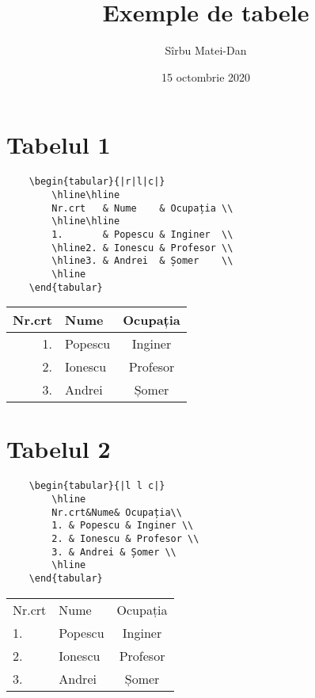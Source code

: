\documentclass[9pt,a4paper]{article}
\title{\bf Exemple de tabele}
\author{Sîrbu Matei-Dan}
\date{15 octombrie 2020}
\begin{document}
\maketitle

\section*{Tabelul 1}

\begin{verbatim}
    \begin{tabular}{|r|l|c|}
        \hline\hline
        Nr.crt   & Nume    & Ocupația \\
        \hline\hline
        1.       & Popescu & Inginer  \\
        \hline2. & Ionescu & Profesor \\
        \hline3. & Andrei  & Șomer    \\
        \hline
    \end{tabular}
\end{verbatim}

\begin{tabular}{|r|l|c|}
    \hline\hline
    Nr.crt   & Nume    & Ocupația \\
    \hline\hline
    1.       & Popescu & Inginer  \\
    \hline2. & Ionescu & Profesor \\
    \hline3. & Andrei  & Șomer    \\
    \hline
\end{tabular}

\section*{Tabelul 2}

\begin{verbatim}
    \begin{tabular}{|l l c|}
        \hline
        Nr.crt&Nume& Ocupația\\
        1. & Popescu & Inginer \\
        2. & Ionescu & Profesor \\
        3. & Andrei & Șomer \\
        \hline
    \end{tabular}
\end{verbatim}

\begin{tabular}{|l l c|}
    \hline
    Nr.crt & Nume    & Ocupația \\
    1.     & Popescu & Inginer  \\
    2.     & Ionescu & Profesor \\
    3.     & Andrei  & Șomer    \\
    \hline
\end{tabular}
\end{document}
